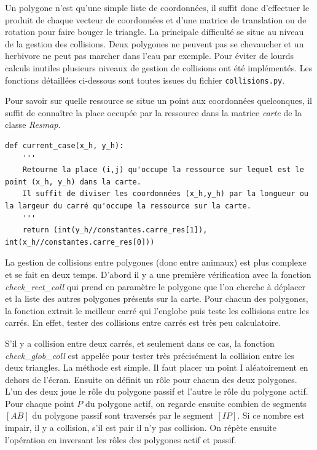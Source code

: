 \documentclass[a4paper,11pt,final,oneside]{article}
\begin{document}
Un polygone n'est qu'une simple liste de coordonnées, il suffit donc d'effectuer le produit de chaque vecteur de coordonnées et d'une matrice de translation ou de rotation pour faire bouger le triangle. La principale difficulté se situe au niveau de la gestion des collisions. Deux polygones ne peuvent pas se chevaucher et un herbivore ne peut pas marcher dans l'eau par exemple. Pour éviter de lourds calculs inutiles plusieurs niveaux de gestion de collisions ont été implémentés. Les fonctions détaillées ci-dessous sont toutes issues du fichier \texttt{collisions.py}.


Pour savoir sur quelle ressource se situe un point aux coordonnées quelconques, il suffit de connaître la place occupée par la ressource dans la matrice \textit{carte} de la classe \textit{Resmap}. \\

\begin{lstlisting}
def current_case(x_h, y_h):
	'''
	Retourne la place (i,j) qu'occupe la ressource sur lequel est le point (x_h, y_h) dans la carte.
	Il suffit de diviser les coordonnées (x_h,y_h) par la longueur ou la largeur du carré qu'occupe la ressource sur la carte.
	''' 
    return (int(y_h//constantes.carre_res[1]), int(x_h//constantes.carre_res[0]))
\end{lstlisting}

La gestion de collisions entre polygones (donc entre animaux) est plus complexe et se fait en deux temps. D'abord il y a une première vérification avec la fonction \textit{check\_rect\_coll} qui prend en paramètre le polygone que l'on cherche à déplacer et la liste des autres polygones présents sur la carte. Pour chacun des polygones, la fonction extrait le meilleur carré qui l'englobe puis teste les collisions entre les carrés. En effet, tester des collisions entre carrés est très peu calculatoire.

S'il y a collision entre deux carrés, et seulement dans ce cas, la fonction \\ \textit{{check\_glob\_coll}} est appelée pour tester très précisément la collision entre les deux triangles. La méthode est simple. Il faut placer un point I aléatoirement en dehors de l'écran. Ensuite on définit un rôle pour chacun des deux polygones. L'un des deux joue le rôle du polygone passif et l'autre le rôle du polygone actif. Pour chaque point $P$ du polygone actif, on regarde ensuite combien de segments $[AB]$ du polygone passif sont traversés par le segment $[IP]$. Si ce nombre est impair, il y a collision, s'il est pair il n'y pas collision. On répète ensuite l'opération en inversant les rôles des polygones actif et passif. 
\end{document}
